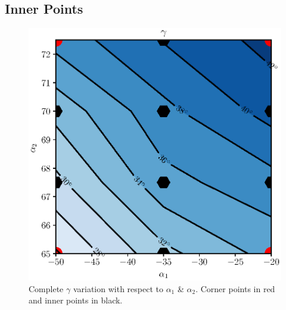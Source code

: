 

\subsection{Inner Points}

\begin{figure}[H]
    \centering
    \includegraphics[scale=\scaleContour]{./images/staggerComplete.eps}
    \caption{Complete $\gamma$ variation with respect to $\alpha_1$ \& $\alpha_2$. Corner points in red and inner points in black.}
    \label{fig:linearInterpolationFinal}
\end{figure}

% 
% 

